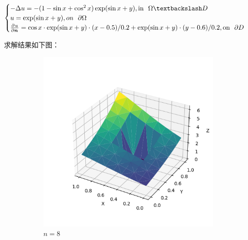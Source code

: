 \documentclass[lang=cn,a4paper,newtx,bibend=bibtex]{elegantpaper}
\begin{document}
\[
  \begin{cases}
    - \Delta u = -(1 - \sin x + \cos^2 x) \exp(\sin x + y), \text{in~~} \Omega \fxg D \\
    u = \exp(\sin x + y), {on~~} \partial \Omega \\
    \apart{u}{\bm{n}}{} = \cos x \cdot \exp(\sin x + y) \cdot (x - 0.5)/0.2 + \exp(\sin x + y) \cdot (y - 0.6) / 0.2, \text{on~~} \partial D
  \end{cases}
\]

求解结果如下图：

\begin{figure}[H]
  \centering
  \begin{subfigure}[b]{0.18\textwidth}
      \includegraphics[width=\textwidth]{../../res_bac/res-[data|1-mixed-irregular-a8].png}
      \caption{$n =  8$}
  \end{subfigure}
  \hfill
  \begin{subfigure}[b]{0.18\textwidth}

\end{subfigure}
\end{figure}
\end{document}
